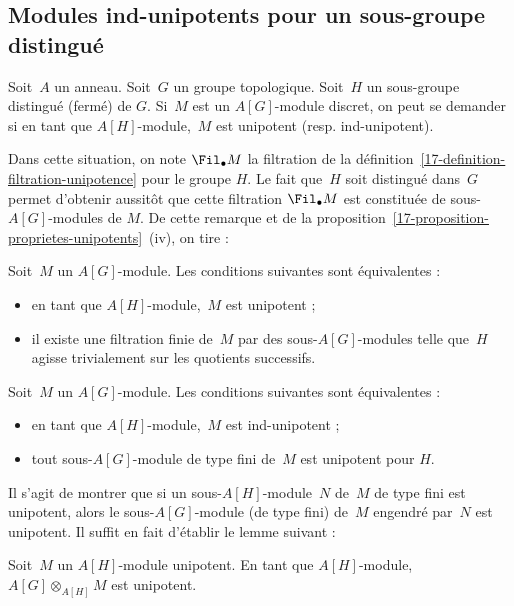 \documentclass[10pt]{../fichiers-configuration-latex/smfart}
\begin{document}
\subsection{Modules ind-unipotents pour un sous-groupe distingué}%
\label{17-subsection-modules-ind-unipotents-sous-groupe-distingue}

Soit $A$ un anneau. Soit $G$ un groupe topologique. Soit $H$ un sous-groupe
distingué (fermé) de $G$. Si $M$ est un $A[G]$-module discret, on peut se
demander si en tant que $A[H]$-module, $M$ est unipotent (resp.
ind-unipotent).

Dans cette situation, on note $\Fil_\bullet M$ la filtration de la
définition~\ref{17-definition-filtration-unipotence} pour le groupe
$H$. Le fait que $H$ soit distingué dans $G$ permet d'obtenir aussitôt que
cette filtration $\Fil_\bullet M$ est constituée de sous-$A[G]$-modules de
$M$. De cette remarque et de la 
proposition~\ref{17-proposition-proprietes-unipotents}~(iv),
on tire :

\begin{proposition2}
Soit $M$ un $A[G]$-module. Les conditions suivantes sont équivalentes :
\begin{itemize}
\item en tant que $A[H]$-module, $M$ est unipotent ;
\item il existe une filtration finie de $M$ par des sous-$A[G]$-modules
telle que $H$ agisse trivialement sur les quotients successifs.
\end{itemize}
\end{proposition2}

\begin{proposition2}
Soit $M$ un $A[G]$-module. Les conditions suivantes sont équivalentes :
\begin{itemize}
\item en tant que $A[H]$-module, $M$ est ind-unipotent ;
\item tout sous-$A[G]$-module de type fini de $M$ est unipotent pour
$H$.
\end{itemize}
\end{proposition2}

Il s'agit de montrer que si un sous-$A[H]$-module $N$ de $M$ de type fini
est unipotent, alors le sous-$A[G]$-module (de type fini) de $M$ engendré
par $N$ est unipotent. Il suffit en fait d'établir le lemme suivant :

\begin{lemme2}
Soit $M$ un $A[H]$-module unipotent.
En tant que $A[H]$-module, $A[G]\otimes_{A[H]} M$ est unipotent.
\end{lemme2}
\end{document}
